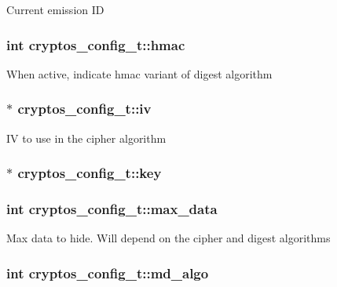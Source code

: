 \label{structcryptos__config__t_a201dba03c6609d57a8c2949496e52cdf}
Current emission ID \hypertarget{structcryptos__config__t_a4ccc3efa7eb7c5bac4424489b1e9e616}{
\subsubsection[{hmac}]{\setlength{\rightskip}{0pt plus 5cm}int {\bf cryptos\_\-config\_\-t::hmac}}}
\label{structcryptos__config__t_a4ccc3efa7eb7c5bac4424489b1e9e616}
When active, indicate hmac variant of digest algorithm \hypertarget{structcryptos__config__t_a66a52c965c6c838e343ebeb05a4a5cf2}{
\subsubsection[{iv}]{$\ast$ {\bf cryptos\_\-config\_\-t::iv}}}
\label{structcryptos__config__t_a66a52c965c6c838e343ebeb05a4a5cf2}
IV to use in the cipher algorithm \hypertarget{structcryptos__config__t_a3a247a5836789dbf4b0a0000754794a9}{
\subsubsection[{key}]{$\ast$ {\bf cryptos\_\-config\_\-t::key}}}
\label{structcryptos__config__t_a3a247a5836789dbf4b0a0000754794a9}
\hypertarget{structcryptos__config__t_a131f67ed366d0d24a6f9dd20e06f2030}{
\subsubsection[{max\_\-data}]{\setlength{\rightskip}{0pt plus 5cm}int {\bf cryptos\_\-config\_\-t::max\_\-data}}}
\label{structcryptos__config__t_a131f67ed366d0d24a6f9dd20e06f2030}
Max data to hide. Will depend on the cipher and digest algorithms \hypertarget{structcryptos__config__t_ad9bab3292aaefb4655a76ba03bb4e647}{
\subsubsection[{md\_\-algo}]{\setlength{\rightskip}{0pt plus 5cm}int {\bf cryptos\_\-config\_\-t::md\_\-algo}}}
